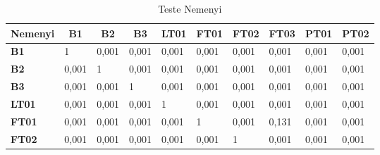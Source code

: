 \begin{table}[!htb]
	\centering
	\caption{Teste Nemenyi}\label{tb:nemeyi}
	\begin{tabular}{@{}llllllllll@{}}
		\toprule
		\multicolumn{1}{l}{\textbf{Nemenyi}} & \multicolumn{1}{c}{\textbf{B1}} & \multicolumn{1}{c}{\textbf{B2}} & \multicolumn{1}{c}{\textbf{B3}} & \multicolumn{1}{c}{\textbf{LT01}} & \multicolumn{1}{c}{\textbf{FT01}} & \multicolumn{1}{c}{\textbf{FT02}} & \multicolumn{1}{c}{\textbf{FT03}} & \multicolumn{1}{c}{\textbf{PT01}} & \multicolumn{1}{c}{\textbf{PT02}} \\ \midrule
		\textbf{B1}                         & 1                         & 0,001                          & 0,001                          & 0,001                          & 0,001                          & 0,001                          & 0,001                          & 0,001                          & 0,001                          \\
		\textbf{B2}                         & 0,001                          & 1                          & 0,001                          & 0,001                          & 0,001                          & 0,001                          & 0,001                          & 0,001                          & 0,001                          \\
		\textbf{B3}                         & 0,001                          & 0,001                          & 1                          & 0,001                          & 0,001                          & 0,001                          & 0,001                          & 0,001                          & 0,001                          \\
		\textbf{LT01}                       & 0,001                          & 0,001                          & 0,001                          & 1                          & 0,001                          & 0,001                          & 0,001                          & 0,001                          & 0,001                          \\
		\textbf{FT01}                       & 0,001                          & 0,001                          & 0,001                          & 0,001                          & 1                          & 0,001                          & 0,131                          & 0,001                          & 0,001                          \\
		\textbf{FT02}                       & 0,001                          & 0,001                          & 0,001                          & 0,001                          & 0,001                          & 1                          & 0,001                          & 0,001                          & 0,001                          \\

\end{tabular}
\end{table}
